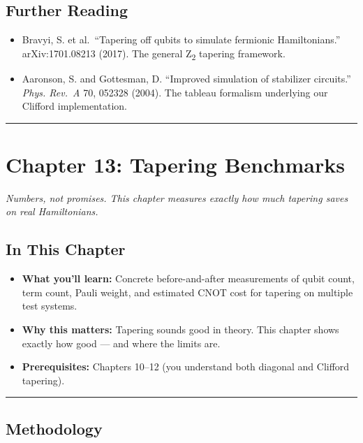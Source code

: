 \documentclass[
  11pt,
  oneside]{book}
\providecommand{\tightlist}{%
  \setlength{\itemsep}{0pt}\setlength{\parskip}{0pt}}
\begin{document}
\section{Further Reading}\label{further-reading-10}

\begin{itemize}
\tightlist
\item
  Bravyi, S. et al.~``Tapering off qubits to simulate fermionic
  Hamiltonians.'' arXiv:1701.08213 (2017). The general Z\textsubscript{2} tapering
  framework.
\item
  Aaronson, S. and Gottesman, D. ``Improved simulation of stabilizer
  circuits.'' \emph{Phys. Rev.~A} 70, 052328 (2004). The tableau
  formalism underlying our Clifford implementation.
\end{itemize}

\begin{center}\rule{0.5\linewidth}{0.5pt}\end{center}

\chapter{Chapter 13: Tapering
Benchmarks}\label{chapter-13-tapering-benchmarks}

\emph{Numbers, not promises. This chapter measures exactly how much
tapering saves on real Hamiltonians.}

\section{In This Chapter}\label{in-this-chapter-12}

\begin{itemize}
\tightlist
\item
  \textbf{What you'll learn:} Concrete before-and-after measurements of
  qubit count, term count, Pauli weight, and estimated CNOT cost for
  tapering on multiple test systems.
\item
  \textbf{Why this matters:} Tapering sounds good in theory. This
  chapter shows exactly how good --- and where the limits are.
\item
  \textbf{Prerequisites:} Chapters 10--12 (you understand both diagonal
  and Clifford tapering).
\end{itemize}

\begin{center}\rule{0.5\linewidth}{0.5pt}\end{center}

\section{Methodology}\label{methodology}
\end{document}

